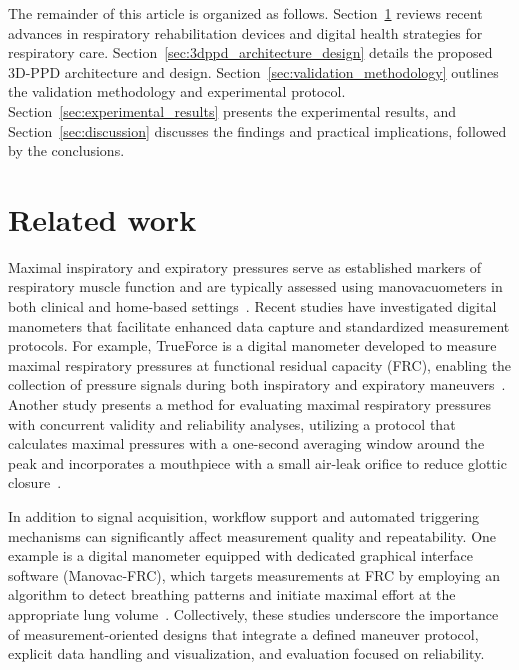 \documentclass{ieeeaccess}
\begin{document}
The remainder of this article is organized as follows. Section~\ref{sec:related_work} reviews recent advances in respiratory rehabilitation devices and digital health strategies for respiratory care. Section~\ref{sec:3dppd_architecture_design} details the proposed 3D-PPD architecture and design. Section~\ref{sec:validation_methodology} outlines the validation methodology and experimental protocol. Section~\ref{sec:experimental_results} presents the experimental results, and Section~\ref{sec:discussion} discusses the findings and practical implications, followed by the conclusions.

\section{Related work}
\label{sec:related_work}

Maximal inspiratory and expiratory pressures serve as established markers of respiratory muscle function and are typically assessed using manovacuometers in both clinical and home-based settings~\cite{Holland2021,Rietberg2017}. Recent studies have investigated digital manometers that facilitate enhanced data capture and standardized measurement protocols. For example, TrueForce is a digital manometer developed to measure maximal respiratory pressures at functional residual capacity (FRC), enabling the collection of pressure signals during both inspiratory and expiratory maneuvers~\cite{pereiraTrueForceDigital2021}. Another study presents a method for evaluating maximal respiratory pressures with concurrent validity and reliability analyses, utilizing a protocol that calculates maximal pressures with a one-second averaging window around the peak and incorporates a mouthpiece with a small air-leak orifice to reduce glottic closure~\cite{silveiraNewMethodMaximalPressures2021}.

In addition to signal acquisition, workflow support and automated triggering mechanisms can significantly affect measurement quality and repeatability. One example is a digital manometer equipped with dedicated graphical interface software (Manovac-FRC), which targets measurements at FRC by employing an algorithm to detect breathing patterns and initiate maximal effort at the appropriate lung volume~\cite{silveiraMaximalPressuresFRC2023}. Collectively, these studies underscore the importance of measurement-oriented designs that integrate a defined maneuver protocol, explicit data handling and visualization, and evaluation focused on reliability.
\end{document}
